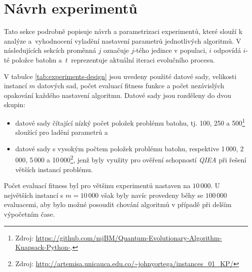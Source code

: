 \section{Návrh experimentů}\label{sec:experiments-design}
Tato sekce podrobně popisuje návrh a parametrizaci experimentů, které slouží k analýze a~vyhodnocení vyladění nastavení parametrů jednotlivých algoritmů. 
V následujících sekcích proměnná $j$ označuje $j$-tého jedince v populaci, $i$ odpovídá $i$-té položce batohu a~$t$~reprezentuje aktuální iteraci evolučního procesu. 

V tabulce \ref{tab:experiments-design} jsou uvedeny použité datové sady, velikosti instancí $m$ datových sad, počet evaluací fitness funkce a počet nezávislých opakování každého nastavení algoritmu. 
Datové sady jsou rozděleny do dvou skupin:
\begin{itemize}
    \item datové sady čítající nízký počet položek problému batohu, tj. 100, 250 a 500\footnote{Zdroj: \url{https://github.com/mjBM/Quantum-Evolutionary-Algorithm-Knapsack-Python-}.} sloužící pro ladění parametrů a
    \item datové sady s vysokým počtem položek problému batohu, respektive 1\,000, 2\,000, 5\,000 a 10\,000\footnote{Zdroj: \url{http://artemisa.unicauca.edu.co/~johnyortega/instances_01_KP/}}, jenž byly využity pro ověření schopností \emph{QIEA} při řešení větších instancí problému. 
\end{itemize}
Počet evaluací fitness byl pro většinu experimentů nastaven na $10\,000$. 
U největších instancí s $m = 10\,000$ však byly navíc provedeny běhy se $100\,000$ evaluacemi, aby bylo možné posoudit chování algoritmů v případě při delším výpočetním čase. 

